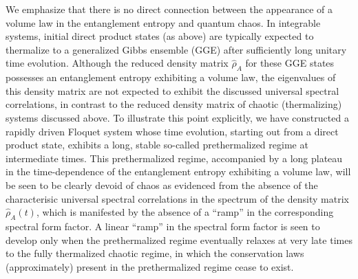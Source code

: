 \documentclass[aps,prb,preprint,onecolumn,amsmath,amssymb,superscriptaddress,eqsecnum,floatfix,scrartcl]{revtex4-1}
\begin{document}
We  emphasize that there is no direct connection between the  appearance of a volume law in the entanglement entropy and  quantum chaos.
 In 
 integrable systems,  initial direct  product states (as above)  are typically expected to
thermalize to a generalized Gibbs ensemble  (GGE)  after sufficiently  long unitary time evolution\cite{Rigol2007,Rigol2006,Calabrese2007, Cardy2015}.
Although the reduced density matrix ${\hat  \rho}_A$  for these  GGE states possesses  an  entanglement entropy exhibiting a volume law,
the eigenvalues of this density matrix 
are not expected to exhibit
the discussed universal spectral correlations,
in contrast to the reduced density matrix of chaotic (thermalizing) systems  discussed above.
To illustrate this point explicitly, we have constructed
 a rapidly  driven Floquet system whose time evolution, starting out from a direct product state, 
exhibits  a long, stable so-called  prethermalized regime\cite{Mori2016,Abanin2015,Abanin_2017,Else_2017} at intermediate times.
This prethermalized regime, accompanied by a long plateau 
in the time-dependence of the entanglement entropy  exhibiting a volume law,
will   be seen to be clearly  devoid of chaos as evidenced from the absence of 
the characterisic universal spectral correlations
in the spectrum  of the density matrix ${\hat  \rho}_A(t)$,
which is manifested by the absence of a ``ramp'' in the corresponding spectral form factor.
A  linear ``ramp'' in the spectral form factor is seen to develop
 only when the prethermalized regime eventually relaxes at very  late times to the fully thermalized  chaotic regime, in which the conservation laws
(approximately) present in the prethermalized regime cease to exist.
\end{document}
